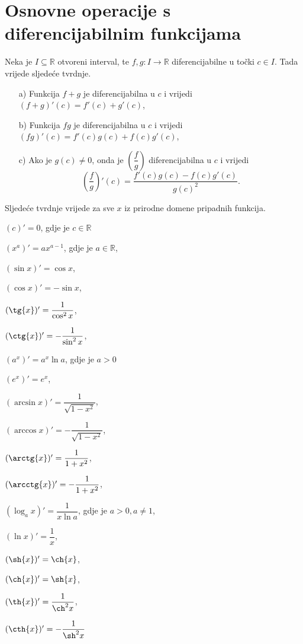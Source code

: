 \section{Osnovne operacije s diferencijabilnim funkcijama}
\begin{remark}
Neka je $I\subseteq \mathbb{R}$ otvoreni interval, te $f, g : I\to \mathbb{R}$ diferencijabilne u točki $c\in I$. Tada vrijede sljedeće tvrdnje.
\begin{itemize}
\item[a)] Funkcija $f+g$ je diferencijabilna u $c$ i vrijedi $(f+g)'(c)=f'(c)+g'(c)$,
\item[b)] Funkcija $fg$ je diferencijabilna u $c$ i vrijedi $(fg)'(c)=f'(c)g(c)+f(c)g'(c)$,
\item[c)] Ako je $g(c)\neq 0$, onda je $\left(\dfrac{f}{g}\right)$ diferencijabilna u $c$ i vrijedi $$\left(\dfrac{f}{g}\right)'(c)=\dfrac{f'(c)g(c)-f(c)g'(c)}{g(c)^2}.$$ 
\end{itemize}
\end{remark}
\begin{remark} Sljedeće tvrdnje vrijede za sve $x$ iz prirodne domene pripadnih funkcija.
\begin{AutoMultiColItemize}
\item $(c)'=0$, gdje je $c\in \mathbb{R}$
\item $(x^a)'=ax^{a-1}$, gdje je $a\in\mathbb{R}$,
\item $(\sin{x})'=\cos{x}$,
\item $(\cos{x})'=-\sin{x}$,
\item $(\tg{x})'=\dfrac{1}{\cos^2{x}}$,
\item $(\ctg{x})'=-\dfrac{1}{\sin^2{x}}$,
\item $(a^x)'=a^x\ln{a}$, gdje je $a>0$
\item $(e^x)'=e^x$,
\item $(\arcsin{x})'=\dfrac{1}{\sqrt{1-x^2}}$,
\item $(\arccos{x})'=-\dfrac{1}{\sqrt{1-x^2}}$,
\item $(\arctg{x})'=\dfrac{1}{1+x^2}$,
\item $(\arcctg{x})'=-\dfrac{1}{1+x^2}$,
\item $(\log_a{x})'=\dfrac{1}{x\ln{a}}$, gdje je $a>0, a\neq 1$,
\item $(\ln{x})'=\dfrac{1}{x}$,
\item $(\sh{x})'=\ch{x}$,
\item $(\ch{x})'=\sh{x}$,
\item $(\th{x})'=\dfrac{1}{\ch^2{x}}$,
\item $(\cth{x})'=-\dfrac{1}{\sh^2{x}}$
\end{AutoMultiColItemize}
\end{remark}